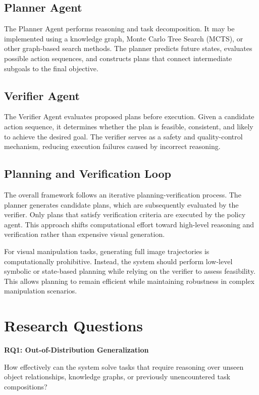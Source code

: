 \documentclass{article} %
\begin{document}
\subsection{Planner Agent}

The Planner Agent performs reasoning and task decomposition. It may be implemented using a knowledge graph, Monte Carlo Tree Search (MCTS), or other graph-based search methods. The planner predicts future states, evaluates possible action sequences, and constructs plans that connect intermediate subgoals to the final objective.

\subsection{Verifier Agent}

The Verifier Agent evaluates proposed plans before execution. Given a candidate action sequence, it determines whether the plan is feasible, consistent, and likely to achieve the desired goal. The verifier serves as a safety and quality-control mechanism, reducing execution failures caused by incorrect reasoning.

\subsection{Planning and Verification Loop}

The overall framework follows an iterative planning-verification process. The planner generates candidate plans, which are subsequently evaluated by the verifier. Only plans that satisfy verification criteria are executed by the policy agent. This approach shifts computational effort toward high-level reasoning and verification rather than expensive visual generation.

For visual manipulation tasks, generating full image trajectories is computationally prohibitive. Instead, the system should perform low-level symbolic or state-based planning while relying on the verifier to assess feasibility. This allows planning to remain efficient while maintaining robustness in complex manipulation scenarios.

\section{Research Questions}

\textbf{RQ1: Out-of-Distribution Generalization}

How effectively can the system solve tasks that require reasoning over unseen object relationships, knowledge graphs, or previously unencountered task compositions?
\end{document}

